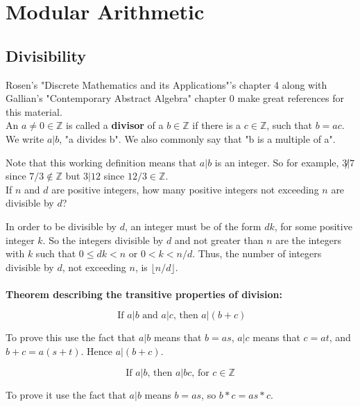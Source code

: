 \section{Modular Arithmetic}



\subsection{Divisibility}

Rosen's "Discrete Mathematics and its Applications"'s chapter 4 along with Gallian's "Contemporary
Abstract Algebra" chapter 0 make great references for this material.
\\

An $a \neq 0 \in \mathbb{Z}$ is called a \textbf{divisor}
of a $b \in \mathbb{Z}$
if there is a $c\in\mathbb{Z}$, such that $b = ac$.
We write $a|b$, "a divides b". We also commonly say that "b is a multiple of a".

Note that this working definition means that $a|b$ is an integer.
So for example, $3\not| 7$ since $7 / 3 \notin \mathbb{Z}$ but $3|12$ since $12/3 \in \mathbb{Z}$.
\\

If $n$ and $d$ are positive integers, how many positive integers not exceeding $n$ are divisible by $d$?

In order to be divisible by $d$, an integer must be of the form $dk$, for some positive integer $k$.
So the integers divisible by $d$ and not greater than $n$ are the integers with $k$ such that
$0 \leq dk < n$
or $0 < k < n/d$.
Thus, the number of integers divisible by $d$, not exceeding $n$, is $\lfloor n / d \rfloor$.
\\~\\


\textbf{Theorem describing the transitive properties of division:}

\begin{equation}
\text{ If $a|b$ and $a|c$, then $a|(b+c)$}
\end{equation}

To prove this use the fact that $a|b$ means that $b = as$, $a|c$ means that $c=at$,
and $b+c = a(s+t)$.
Hence $a|(b+c)$.

\begin{equation}
\text{If $a|b$, then $a|bc$, for $c \in \mathbb{Z}$}
\end{equation}

To prove it use the fact that $a|b$ means $b = as$, so $b*c = as * c$.

